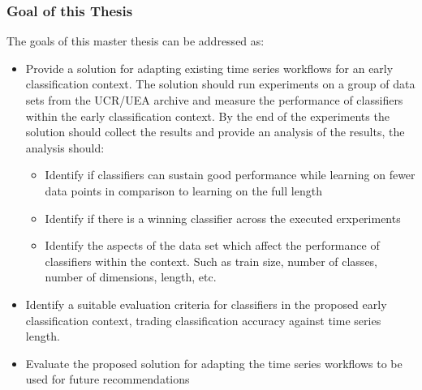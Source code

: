 \subsubsection*{Goal of this Thesis}
\label{thesisGoals}
The goals of this master thesis can be addressed as:

\begin{itemize}
    \item Provide a solution for adapting existing time series workflows for an early classification context. The solution should run experiments on a group of data sets from the UCR/UEA archive and measure the performance of classifiers within the early classification context. By the end of the experiments the solution should collect the results and provide an analysis of the results, the analysis should:
    \begin{itemize}
        \item Identify if classifiers can sustain good performance while learning on fewer data points in comparison to learning on the full length
        \item Identify if there is a winning classifier across the executed erxperiments
        \item Identify the aspects of the data set which affect the performance of classifiers within the context. Such as train size, number of classes, number of dimensions, length, etc.
    \end{itemize}
    \item Identify a suitable evaluation criteria for classifiers in the proposed early classification context, trading classification accuracy against time series length.
    \item Evaluate the proposed solution for adapting the time series workflows to be used for future recommendations
\end{itemize}

